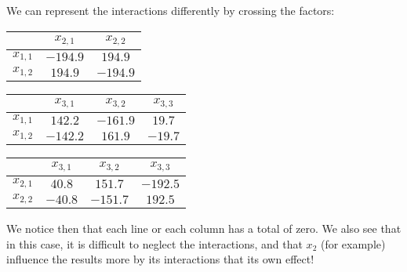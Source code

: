 	We can represent the interactions differently by crossing the factors:
	\begin{table}[H]\centering
		\centering
		\begin{tabular}{|c|c|c|}
		\hline
		\multicolumn{1}{c}{\cellcolor{black!30}} & 
	  	\multicolumn{1}{c}{\cellcolor{black!30}$x_{2,1}$} & 
	  	\multicolumn{1}{c}{\cellcolor{black!30}$x_{2,2}$} \\ \hline
		\multicolumn{1}{c}{\cellcolor{black!30}$x_{1,1}$}  & $-194.9$ & $194.9$ \\ \hline
		\multicolumn{1}{c}{\cellcolor{black!30}$x_{1,2}$} & $194.9$ & $-194.9$ \\ \hline
	 	\end{tabular}
	\end{table}
	\begin{table}[H]\centering
		\centering
		\begin{tabular}{|c|c|c|c|}
		\hline
		\multicolumn{1}{c}{\cellcolor{black!30}} & 
	  	\multicolumn{1}{c}{\cellcolor{black!30}$x_{3,1}$} & 
	  	\multicolumn{1}{c}{\cellcolor{black!30}$x_{3,2}$}  & 
	  	\multicolumn{1}{c}{\cellcolor{black!30}$x_{3,3}$}  \\ \hline
		\multicolumn{1}{c}{\cellcolor{black!30}$x_{1,1}$}  & $142.2$ & $-161.9$ & $19.7$ \\ \hline
		\multicolumn{1}{c}{\cellcolor{black!30}$x_{1,2}$} & $-142.2$ & $161.9$ & $-19.7$ \\ \hline
	 \end{tabular}
	\end{table}
		 \begin{table}[H]\centering
		\centering
		\begin{tabular}{|c|c|c|c|}
		\hline
		\multicolumn{1}{c}{\cellcolor{black!30}} & 
	  	\multicolumn{1}{c}{\cellcolor{black!30}$x_{3,1}$} & 
	  	\multicolumn{1}{c}{\cellcolor{black!30}$x_{3,2}$}  & 
	  	\multicolumn{1}{c}{\cellcolor{black!30}$x_{3,3}$}  \\ \hline
		\multicolumn{1}{c}{\cellcolor{black!30}$x_{2,1}$}  & $40.8$ & $151.7$ & $-192.5$ \\ \hline
		\multicolumn{1}{c}{\cellcolor{black!30}$x_{2,2}$} & $-40.8$ & $-151.7$ & $192.5$ \\ \hline
	 	\end{tabular}
	\end{table}      
	We notice then that each line or each column has a total of zero. We also see that in this case, it is difficult to neglect the interactions, and that $x_2$ (for example) influence the results more by its interactions that its own effect!\\

